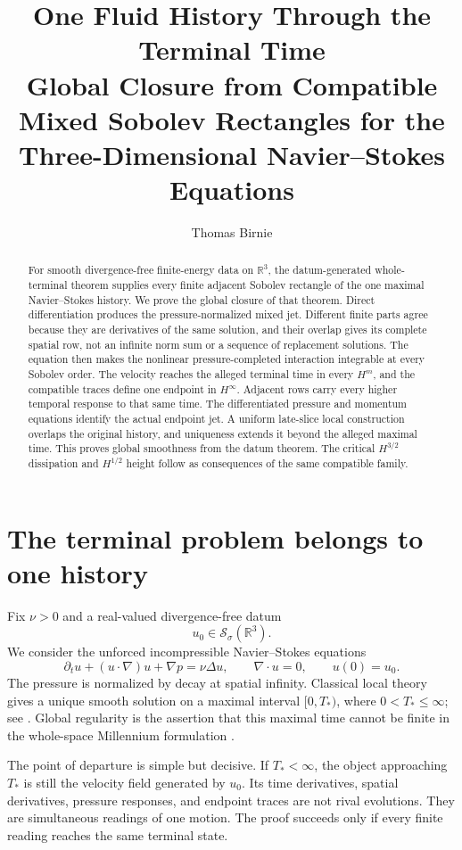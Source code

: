 \documentclass[11pt]{article}
\title{\bfseries One Fluid History Through the Terminal Time\\[0.35em]
\large Global Closure from Compatible Mixed Sobolev Rectangles for the
Three-Dimensional Navier--Stokes Equations}
\author{Thomas Birnie}
\date{}
\theoremstyle{definition}
\theoremstyle{remark}
\newcommand{\R}{\mathbb R}
\newcommand{\Schwartz}{\mathcal S}
\begin{document}
\maketitle

\begin{abstract}
For smooth divergence-free finite-energy data on \(\R^3\), the
datum-generated whole-terminal theorem supplies every finite adjacent
Sobolev rectangle of the one maximal Navier--Stokes history.  We prove the
global closure of that theorem.  Direct differentiation produces the
pressure-normalized mixed jet.  Different finite parts agree because they are
derivatives of the same solution, and their overlap gives its complete
spatial row, not an infinite norm sum or a sequence of replacement solutions.
The equation then makes the nonlinear pressure-completed interaction
integrable at every Sobolev order.  The velocity reaches the alleged terminal
time in every \(H^m\), and the compatible traces define one endpoint in
\(H^\infty\).  Adjacent rows carry every higher temporal response to that
same time.  The differentiated pressure and momentum equations identify the
actual endpoint jet.  A uniform late-slice local construction overlaps the
original history, and uniqueness extends it beyond the alleged maximal time.
This proves global smoothness from the datum theorem.  The critical
\(H^{3/2}\) dissipation and \(H^{1/2}\) height follow as consequences of the
same compatible family.
\end{abstract}

\section{The terminal problem belongs to one history}

Fix \(\nu>0\) and a real-valued divergence-free datum
\[
 u_0\in \Schwartz_\sigma(\R^3).
\]
We consider the unforced incompressible Navier--Stokes equations
\begin{equation}
 \partial_tu+(u\cdot\nabla)u+\nabla p=\nu\Delta u,
 \qquad \nabla\cdot u=0,
 \qquad u(0)=u_0.
 \label{eq:NS}
\end{equation}
The pressure is normalized by decay at spatial infinity.  Classical local
theory gives a unique smooth solution on a maximal interval
\([0,T_*)\), where \(0<T_*\leq\infty\); see
\cite{FujitaKato,Kato}.  Global regularity is the assertion that this maximal
time cannot be finite in the whole-space Millennium formulation
\cite{Fefferman}.

The point of departure is simple but decisive.  If \(T_*<\infty\), the object
approaching \(T_*\) is still the velocity field generated by \(u_0\).  Its
time derivatives, spatial derivatives, pressure responses, and endpoint
traces are not rival evolutions.  They are simultaneous readings of one
motion.  The proof succeeds only if every finite reading reaches the same
terminal state.
\end{document}
